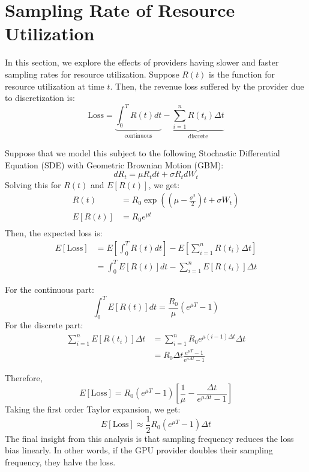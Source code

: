 \documentclass{article}
\begin{document}

\section{Sampling Rate of Resource Utilization}
In this section, we explore the effects of providers having slower and faster sampling rates for resource utilization. Suppose $R(t)$ is the function for resource utilization at time $t$. Then, the revenue loss suffered by the provider due to discretization is:
\[\text{Loss} = \underbrace{\int_0^T R(t)dt}_{\text{continuous}} - \underbrace{\sum_{i = 1}^n R(t_i)\Delta t}_{\text{discrete}}\]

Suppose that we model this subject to the following Stochastic Differential Equation (SDE) with Geometric Brownian Motion (GBM):
\[dR_t = \mu R_t dt + \sigma R_t dW_t\]
Solving this for $R(t)$ and $E[R(t)]$, we get:
\begin{align*}
    R(t) &= R_0 \exp\left(\left(\mu - \frac{\sigma^2}{2}\right)t+\sigma W_t\right) \\ 
    E[R(t)] &= R_0 e^{\mu t} \\
\end{align*}
Then, the expected loss is:
\begin{align*}
    E[\text{Loss}] &= E\left[\int_0^T R(t)dt\right] - E\left[\sum_{i = 1}^n R(t_i)\Delta t\right] \\
    &= \int_0^T E[R(t)]dt - \sum_{i = 1}^n E[R(t_i)]\Delta t
\end{align*}

For the continuous part:
\[\int_0^T E[R(t)]dt = \frac{R_0}{\mu} (e^{\mu T} - 1)\]
For the discrete part:
\begin{align*}
    \sum_{i = 1}^n E[R(t_i)]\Delta t &= \sum_{i = 1}^n R_0 e^{\mu (i-1)\Delta t} \Delta t\\
    &=R_0 \Delta t \frac{e^{\mu T} - 1}{e^{\mu \Delta t} - 1}
\end{align*}

Therefore, 
\[E[\text{Loss}] = R_0 (e^{\mu T} - 1) \left[\frac{1}{\mu} - \frac{\Delta t}{e^{\mu \Delta t} - 1}\right]\]
Taking the first order Taylor expansion, we get:
\[E[\text{Loss}] \approx \frac{1}{2} R_0 (e^{\mu T} - 1) \Delta t\]
The final insight from this analysis is that sampling frequency reduces the loss bias linearly. In other words, if the GPU provider doubles their sampling frequency, they halve the loss. 

\end{document}
